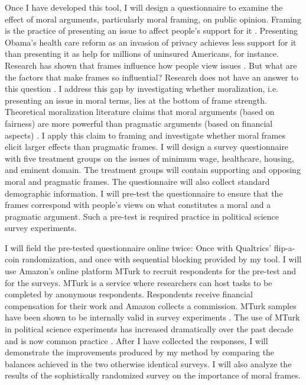\documentclass[11pt]{article}
\begin{document}
Once I have developed this tool, I will design a questionnaire to examine the effect of moral arguments, particularly moral framing, on public opinion. Framing is the practice of presenting an issue to affect people's support for it \citep{druckman_evaluating_2001,gross_framing_2008}. Presenting Obama's health care reform as an invasion of privacy achieves less support for it than presenting it as help for millions of uninsured Americans, for instance. Research has shown that frames influence how people view issues \citep{iyengar_framing_1996,tversky_framing_1981}. But what are the factors that make frames so influential? Research does not have an answer to this question \citep{ryan_reconsidering_2014}. I address this gap by investigating whether moralization, i.e. presenting an issue in moral terms, lies at the bottom of frame strength. Theoretical moralization literature claims that moral arguments (based on fairness) are more powerful than pragmatic arguments (based on financial aspects) \citep{tatalovich_moral_2011}. I apply this claim to framing and investigate whether moral frames elicit larger effects than pragmatic frames. I will design a survey questionnaire with five treatment groups on the issues of minimum wage, healthcare, housing, and eminent domain. The treatment groups will contain supporting and opposing moral and pragmatic frames. The questionnaire will also collect standard demographic information. I will pre-test the questionnaire to ensure that the frames correspond with people's views on what constitutes a moral and a pragmatic argument. Such a pre-test is required practice in political science survey experiments.

I will field the pre-tested questionnaire online twice: Once with Qualtrics' flip-a-coin randomization, and once with sequential blocking provided by my tool. I will use Amazon's online platform MTurk to recruit respondents for the pre-test and for the surveys. MTurk is a service where researchers can host tasks to be completed by anonymous respondents. Respondents receive financial compensation for their work and Amazon collects a commission. MTurk samples have been shown to be internally valid in survey experiments \citep{hauser_attentive_2016}. The use of MTurk in political science experiments has increased dramatically over the past decade and is now common practice \citep{berinsky_evaluating_2012}. After I have collected the responses, I will demonstrate the improvements produced by my method by comparing the balances achieved in the two otherwise identical surveys. I will also analyze the results of the sophistically randomized survey on the importance of moral frames. 
\end{document}
